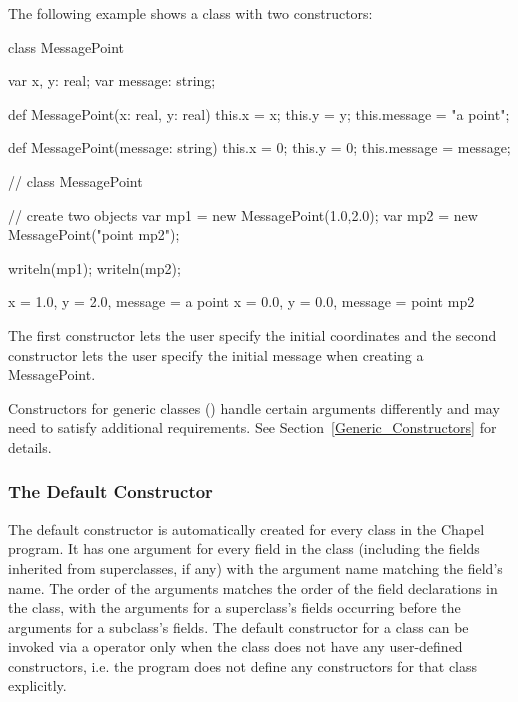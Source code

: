 \begin{example}
The following example shows a class with two constructors:
\begin{chapelpre}
\end{chapelpre}
\begin{chapel}
class MessagePoint {
  var x, y: real;
  var message: string;

  def MessagePoint(x: real, y: real) {
    this.x = x;
    this.y = y;
    this.message = "a point";
  }

  def MessagePoint(message: string) {
    this.x = 0;
    this.y = 0;
    this.message = message;
  }
}  // class MessagePoint

// create two objects
var mp1 = new MessagePoint(1.0,2.0);
var mp2 = new MessagePoint("point mp2");
\end{chapel}
\begin{chapelpost}
writeln(mp1);
writeln(mp2);
\end{chapelpost}
\begin{chapeloutput}
{x = 1.0, y = 2.0, message = a point}
{x = 0.0, y = 0.0, message = point mp2}
\end{chapeloutput}
The first constructor lets the user specify the initial coordinates
and the second constructor lets the user specify the initial message
when creating a MessagePoint.
\end{example}

Constructors for generic classes () handle certain
arguments differently and may need to satisfy additional
requirements. See Section~\ref{Generic_Constructors} for details.

\subsubsection{The Default Constructor}
\label{The_Default_Constructor}

The default constructor is automatically created for every class in
the Chapel program. It has one argument for every field in the class
(including the fields inherited from superclasses, if any)
with the argument name matching the field's name.
The order of the arguments matches the order of the field declarations
in the class, with the arguments for a superclass's fields occurring
before the arguments for a subclass's fields.
The default constructor for a class can be invoked via a 
operator only when the class does not have any user-defined constructors,
i.e. the program does not define any constructors for
that class explicitly.

